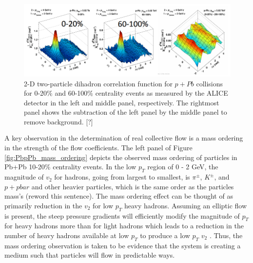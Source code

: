 \begin{figure}[h!]
\begin{center}
\includegraphics[width=0.85\linewidth]{figs/pPb_subtraction_correlation.PNG}
\caption{ 2-D two-particle dihadron correlation function for $p+Pb$ collisions for 0-20\% and 60-100\% centrality events as measured by the ALICE detector in the left and middle panel, respectively. The rightmost panel shows the subtraction of the left panel by the middle panel to remove background. [?]}
\label{fig:pPb_ridge_subtraction}
\end{center}
\end{figure}

A key observation in the determination of real collective flow is a mass ordering in the strength of the flow coefficients. The left panel of Figure \ref{fig:PbpPb_mass_ordering} depicts the observed mass ordering of particles in Pb+Pb 10-20\% centrality events. In the low $p_T$ region of 0 - 2 GeV, the magnitude of $v_2$ for hadrons, going from largest to smallest, is $\pi^{\pm}$, $K^{\pm}$, and $p+pbar$ and other heavier particles, which is the same order as the particles mass's (reword this sentence). The mass ordering effect can be thought of as primarily reduction in the $v_2$ for low $p_T$ heavy hadrons. Assuming an elliptic flow is present, the steep pressure gradients will efficiently modify the magnitude of $p_T$ for heavy hadrons more than for light hadrons which leads to a reduction in the number of heavy hadrons available at low $p_T$ to produce a low $p_T$ $v_2$ \cite{PhysRevC.77.044909}. Thus, the mass ordering observation is taken to be evidence that the system is creating a medium such that particles will flow in predictable ways.

